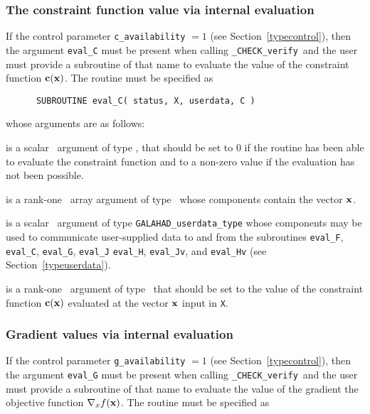 \documentclass{galahad}
\newcommand{\packagename}{CHECK}
\newcommand{\fullpackagename}{\libraryname\_\packagename}
\newcommand{\solver}{{\tt \fullpackagename\_verify}}
\begin{document}
\subsubsection{The constraint function value via internal evaluation\label{cfv}}

If the control parameter {\tt c\_availability} $=1$ (see
Section~\ref{typecontrol}), then the argument
{\tt eval\_C} must be present when calling \solver\ and the
user must provide a subroutine of that name to evaluate the
value of the constraint function ${\mathbf{c}}({\mathbf{x}})$.
The routine must be specified as

\def\baselinestretch{0.8}
{\tt \begin{verbatim}
      SUBROUTINE eval_C( status, X, userdata, C ) \end{verbatim} }
\def\baselinestretch{1.0}
\noindent whose arguments are as follows:

\begin{description}
 is a scalar \intentout\ argument of type \integer,
that should be set to 0 if the routine has been able to evaluate 
the constraint function
and to a non-zero value if the evaluation has not been possible.

 is a rank-one \intentin\ array argument of type \realdp\
whose components contain the vector ${\mathbf{x}}$.

 is a scalar \intentinout\ argument of type 
{\tt GALAHAD\_userdata\_type} whose components may be used
to communicate user-supplied data to and from the
subroutines {\tt eval\_F}, {\tt eval\_C}, {\tt eval\_G}, {\tt eval\_J}
{\tt eval\_H}, {\tt eval\_Jv}, and {\tt eval\_Hv} 
(see Section~\ref{typeuserdata}). 

 is a rank-one \intentout\ argument of type \realdp\
that should be set to the value of the constraint function ${\mathbf{c}}({\mathbf{x}})$
evaluated at the vector ${\mathbf{x}}$ input in {\tt X}.

\end{description}


\subsubsection{Gradient values via internal evaluation\label{gfv}}

If the control parameter {\tt g\_availability} $=1$ (see
Section~\ref{typecontrol}), then the argument {\tt eval\_G} must be
present when calling \solver\ and the
user must provide a subroutine of that name to evaluate the
value of the gradient the objective function $\nabla_x f({\mathbf{x}})$.
The routine must be specified as
\end{document}
